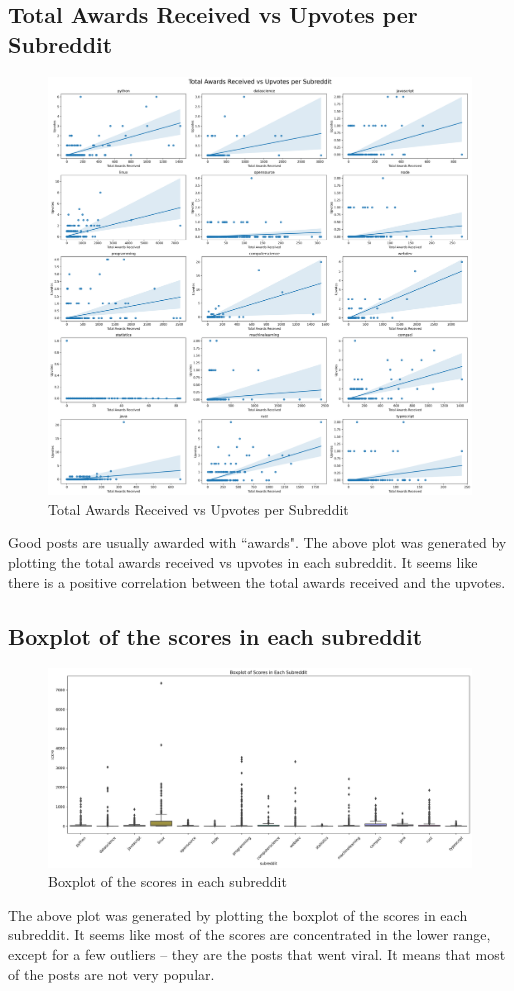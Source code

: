 \documentclass[12pt, letterpage]{article}
\begin{document}
\subsection*{Total Awards Received vs Upvotes per Subreddit}

\begin{figure}[H]
    \centering
    \includegraphics[width=1\textwidth]{awards_per_subreddit.png}
    \caption{Total Awards Received vs Upvotes per Subreddit}
    \label{fig:awards_vs_upvotes}
\end{figure}

Good posts are usually awarded with ``awards". The above plot was generated by plotting the total awards received vs upvotes in each subreddit. It seems like there is a positive correlation between the total awards received and the upvotes.

\subsection*{Boxplot of the scores in each subreddit}

\begin{figure}[H]
    \centering
    \includegraphics[width=1\textwidth]{boxplot_scores.png}
    \caption{Boxplot of the scores in each subreddit}
    \label{fig:boxplot}
\end{figure}

The above plot was generated by plotting the boxplot of the scores in each subreddit. It seems like most of the scores are concentrated in the lower range, except for a few outliers – they are the posts that went viral. It means that most of the posts are not very popular.
\end{document}
